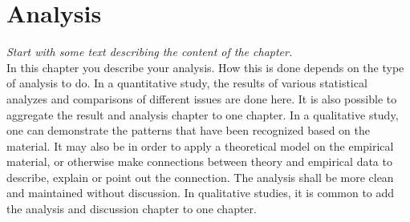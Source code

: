 \chapter{Analysis}
\emph{Start with some text describing the content of the chapter.}\\

\noindent In this chapter you describe your analysis. How this is done depends on the type of analysis to do. In a quantitative study, the results of various statistical analyzes and comparisons of different issues are done here. It is also possible to aggregate the result and analysis chapter to one chapter. In a qualitative study, one can demonstrate the patterns that have been  recognized based on the material. It may also be in order to apply a theoretical model on the empirical material, or otherwise make connections between theory and empirical data to describe, explain or point out the connection. The analysis shall be more clean and maintained without discussion. In qualitative studies, it is common to add the analysis and discussion chapter to one chapter.
